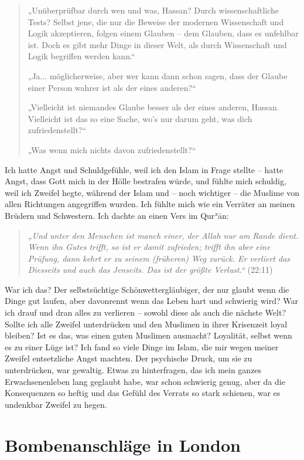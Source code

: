 \documentclass[12pt]{memoir}
\def\´{ʾ} %
\def \Quran{Qur\-\´ān} %
\newcommand{\QRef}[1]{{\color{darkblue}#1}}
\begin{document}
\begin{quote}
„Unüberprüfbar durch wen und was, Hassan?
Durch wissenschaftliche Tests?
Selbst jene, die nur die Beweise der modernen Wissenschaft
und Logik akzeptieren, folgen einem Glauben –
dem Glauben, dass es unfehlbar ist.
Doch es gibt mehr Dinge in dieser Welt,
als durch Wissenschaft und Logik begriffen werden kann.“

„Ja... möglicherweise, aber wer kann dann schon sagen,
dass der Glaube einer Person wahrer ist als der eines anderen?“

„Vielleicht ist niemandes Glaube besser als der eines anderen, Hassan.
Vielleicht ist das so eine Sache, wo’s nur darum geht,
was dich zufriedenstellt?“

„Was wenn mich nichts davon zufriedenstellt?“
\end{quote}

Ich hatte Angst und Schuldgefühle,
weil ich den Islam in Frage stellte –
hatte Angst, dass Gott mich in der Hölle bestrafen würde,
und fühlte mich schuldig, weil ich Zweifel hegte,
während der Islam und – noch wichtiger – die Muslime
von allen Richtungen angegriffen wurden.
Ich fühlte mich wie ein Verräter an meinen Brüdern und Schwestern.
Ich dachte an einen Vers im \Quran:

\begin{quote}
\emph{„Und unter den Menschen ist manch einer, der Allah nur am Rande dient.
Wenn ihn Gutes trifft, so ist er damit zufrieden;
trifft ihn aber eine Prüfung, dann kehrt er zu seinem (früheren) Weg zurück.
Er verliert das Diesseits und auch das Jenseits.
Das ist der größte Verlust.“} (\QRef{22:11})
\end{quote}

War ich das?
Der selbstsüchtige Schönwettergläubiger,
der nur glaubt wenn die Dinge gut laufen,
aber davonrennt wenn das Leben hart und schwierig wird?
War ich drauf und dran alles zu verlieren –
sowohl diese als auch die nächste Welt?
Sollte ich alle Zweifel unterdrücken und den Muslimen
in ihrer Krisenzeit loyal bleiben?
Ist es das, was einen guten Muslimen ausmacht?
Loyalität, selbst wenn es zu einer Lüge ist?
Ich fand so viele Dinge im Islam,
die mir wegen meiner Zweifel entsetzliche Angst machten.
Der psychische Druck, um sie zu unterdrücken, war gewaltig.
Etwas zu hinterfragen,
das ich mein ganzes Erwachsenenleben lang geglaubt habe,
war schon schwierig genug,
aber da die Konsequenzen so heftig
und das Gefühl des Verrats so stark schienen,
war es undenkbar Zweifel zu hegen.


\chapter{Bombenanschläge in London}
\end{document}
